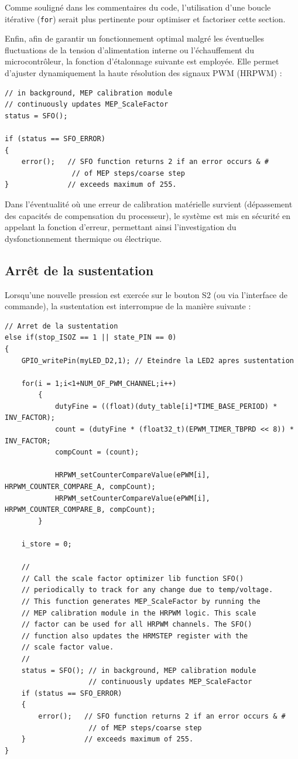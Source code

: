 Comme souligné dans les commentaires du code, l'utilisation d'une boucle itérative (\texttt{for}) serait plus pertinente pour optimiser et factoriser cette section.

Enfin, afin de garantir un fonctionnement optimal malgré les éventuelles fluctuations de la tension d'alimentation interne ou l'échauffement du microcontrôleur, la fonction d'étalonnage suivante est employée. Elle permet d'ajuster dynamiquement la haute résolution des signaux PWM (HRPWM) :

\begin{verbatim}
// in background, MEP calibration module
// continuously updates MEP_ScaleFactor
status = SFO();

if (status == SFO_ERROR)
{
    error();   // SFO function returns 2 if an error occurs & #
                // of MEP steps/coarse step
}              // exceeds maximum of 255.
\end{verbatim}

Dans l'éventualité où une erreur de calibration matérielle survient (dépassement des capacités de compensation du processeur), le système est mis en sécurité en appelant la fonction d'erreur, permettant ainsi l'investigation du dysfonctionnement thermique ou électrique.

\subsection{Arrêt de la sustentation}
Lorsqu'une nouvelle pression est exercée sur le bouton S2 (ou via l'interface de commande), la sustentation est interrompue de la manière suivante :

\begin{verbatim}
// Arret de la sustentation
else if(stop_ISOZ == 1 || state_PIN == 0)
{
    GPIO_writePin(myLED_D2,1); // Eteindre la LED2 apres sustentation

    for(i = 1;i<1+NUM_OF_PWM_CHANNEL;i++)
        {
            dutyFine = ((float)(duty_table[i]*TIME_BASE_PERIOD) * INV_FACTOR);
            count = (dutyFine * (float32_t)(EPWM_TIMER_TBPRD << 8)) * INV_FACTOR;
            compCount = (count);

            HRPWM_setCounterCompareValue(ePWM[i], HRPWM_COUNTER_COMPARE_A, compCount);
            HRPWM_setCounterCompareValue(ePWM[i], HRPWM_COUNTER_COMPARE_B, compCount);
        }

    i_store = 0;

    //
    // Call the scale factor optimizer lib function SFO()
    // periodically to track for any change due to temp/voltage.
    // This function generates MEP_ScaleFactor by running the
    // MEP calibration module in the HRPWM logic. This scale
    // factor can be used for all HRPWM channels. The SFO()
    // function also updates the HRMSTEP register with the
    // scale factor value.
    //
    status = SFO(); // in background, MEP calibration module
                    // continuously updates MEP_ScaleFactor
    if (status == SFO_ERROR)
    {
        error();   // SFO function returns 2 if an error occurs & #
                    // of MEP steps/coarse step
    }              // exceeds maximum of 255.
}
\end{verbatim}

